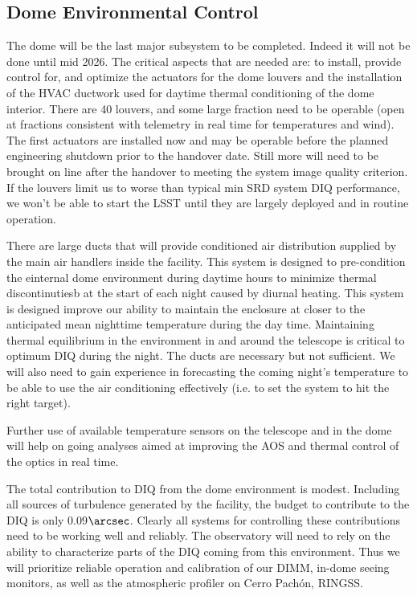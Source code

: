 \subsection{Dome Environmental Control}
The dome will be the last major subsystem to be completed. Indeed it will not be done until mid 2026. The critical aspects that are needed are: to install, provide control for, and optimize the actuators for the dome louvers and the installation of the HVAC ductwork used for daytime thermal conditioning of the dome interior. There are 40 louvers, and some large fraction need to be operable (open at fractions consistent with telemetry in real time for temperatures and wind). The first actuators are installed now and may be operable before the planned engineering shutdown prior to the handover date. Still more will need to be brought on line after the handover to meeting the system image quality criterion. If the louvers limit us to worse than typical min SRD system DIQ performance, we won't be able to start the LSST until they are largely deployed and in routine operation. 

There are large ducts that will provide conditioned air distribution supplied by the main air handlers inside the facility. This system is designed to pre-condition the einternal dome environment during daytime hours to minimize thermal discontinutiesb at the start of each night caused by diurnal heating.  This system is designed improve our ability to maintain the enclosure at closer to the anticipated mean nighttime temperature during the day time. Maintaining thermal equilibrium in the environment in and around the telescope is critical to optimum DIQ during the night. The ducts are necessary but not sufficient. We will also need to gain experience in forecasting the coming night's temperature to be able to use the air conditioning effectively (i.e. to set the system to hit the right target). 

Further use of available temperature sensors on the telescope and in the dome will help on going analyses aimed at improving the AOS and thermal control of the optics in real time. 

The total contribution to DIQ from the dome environment is modest. Including all sources of turbulence generated by the facility, the budget to contribute to the DIQ is only 0.09$\arcsec$. Clearly all systems for controlling these contributions need to be working well and reliably. The observatory will need to rely on the ability to characterize parts of the DIQ coming from this environment. Thus we will prioritize reliable operation and calibration of our DIMM, in-dome seeing monitors, as well as the atmospheric profiler on Cerro Pach\'{on}, RINGSS.  

